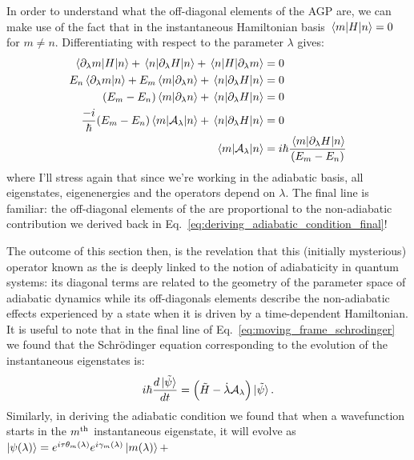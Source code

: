     In order to understand what the off-diagonal elements of the AGP are, we can make use of the fact that in the instantaneous Hamiltonian basis $\mel{m}{H}{n} = 0$ for $m \neq n$. Differentiating with respect to the parameter $\lambda$ gives:
    \begin{equation}\label{eq:differentiating_adiabatic_offdiagonals}
       \begin{aligned}
           \mel{\partial_{\lambda}m}{H}{n} + \mel{n}{\partial_{\lambda}H}{n} + \mel{n}{H}{\partial_{\lambda}m} &= 0 \\
           E_n \braket{\partial_{\lambda} m}{n} + E_m \braket{m}{\partial_{\lambda} n} + \mel{n}{\partial_{\lambda}H}{n} &= 0 \\
           (E_m - E_n) \braket{m}{\partial_{\lambda} n} + \mel{n}{\partial_{\lambda}H}{n} &= 0 \\
           \frac{-i}{\hbar} (E_m - E_n) \mel{m}{\mathcal{A}_{\lambda}}{n} + \mel{n}{\partial_{\lambda}H}{n} &= 0 \\
           \mel{m}{\mathcal{A}_{\lambda}}{n} &= i\hbar \frac{\mel{m}{\partial_{\lambda}H}{n}}{(E_m - E_n)}
       \end{aligned} 
    \end{equation}
    where I'll stress again that since we're working in the adiabatic basis, all eigenstates, eigenenergies and the operators depend on $\lambda$. The final line is familiar: the off-diagonal elements of the  are proportional to the non-adiabatic contribution we derived back in Eq.~\eqref{eq:deriving_adiabatic_condition_final}!

    The outcome of this section then, is the revelation that this (initially mysterious) operator known as the  is deeply linked to the notion of adiabaticity in quantum systems: its diagonal terms are related to the geometry of the parameter space of adiabatic dynamics while its off-diagonals elements describe the non-adiabatic effects experienced by a state when it is driven by a time-dependent Hamiltonian. It is useful to note that in the final line of Eq.~\eqref{eq:moving_frame_schrodinger} we found that the Schr\"{o}dinger equation corresponding to the evolution of the instantaneous eigenstates is:
    \begin{equation}\label{eq:schrodinger_moving_frame_2}
        i \hbar \frac{d \ket*{\Tilde{\psi}}}{dt} = \Big( \Tilde{H} - \dot{\lambda} \mathcal{A}_{\lambda} \Big) \ket*{\Tilde{\psi}}.
    \end{equation}
    Similarly, in deriving the adiabatic condition we found that when a wavefunction starts in the $m^{\rm th}$ instantaneous eigenstate, it will evolve as $\ket{\psi(\lambda)} = e^{i \tau \theta_m(\lambda)}e^{i \gamma_m(\lambda)} \ket{m(\lambda)} + $
    
